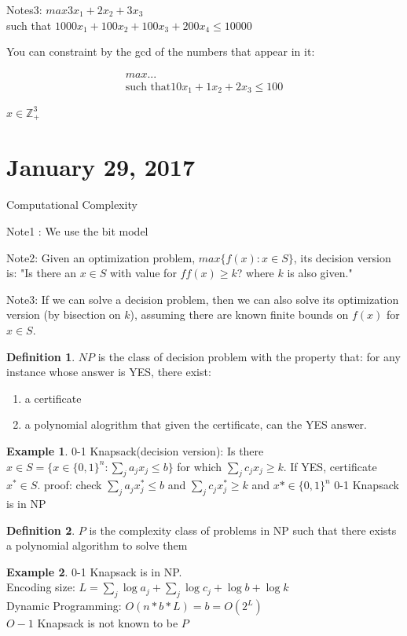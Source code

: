 \documentclass{article}
\theoremstyle{plain}
\theoremstyle{definition}
\newtheorem{eg}{Example}
\newtheorem{defn}{Definition}
\begin{document}
Notes3:
$max 3x_1 + 2x_2 + 3x_3$\\
such that $1000x_1 + 100x_2 + 100x_3 + 200x_4 \leq 10 000$

You can constraint by the gcd of the numbers that appear in it:

\begin{align*}
    max ...\\
    \text{such that} 10x_1 + 1x_2 + 2x_3 \leq 100
\end{align*}

$x\in\mathbb{Z}^3_+$

\section{January 29, 2017}
Computational Complexity

Note1 : We use the bit model

Note2: Given an optimization problem, $max\{f(x): x\in S\}$,
its decision version is:
"Is there an $x\in S$ with value for $ff(x) \geq k$? where
$k$ is also given."

Note3: If we can solve a decision problem, then we can also
solve its optimization version (by bisection on $k$), assuming
there are known finite bounds on $f(x)$ for $x\in S$.

\begin{defn}
    $NP$ is the class of decision problem with the property that:
    for any instance whose answer is YES, there exist:
    \begin{enumerate}
        \item a certificate
        \item a polynomial alogrithm that given the certificate, can
            the YES answer.
    \end{enumerate}
\end{defn}

\begin{eg}
    0-1 Knapsack(decision version): Is there
    $x\in S = \{x\in\{0,1\}^n: \sum_j a_jx_j\leq b\}$
    for which $\sum_j c_jx_j\geq k$. If YES,
    certificate $x^*\in S$. proof:
    check $\sum_j a_jx^*_j\leq b$ and
    $\sum_jc_jx^*_j \geq k$ and $x*\in \{0,1\}^n$
    0-1 Knapsack is in NP
\end{eg}

\begin{defn}
    $P$ is the complexity class of problems in NP such that
    there exists a polynomial algorithm to solve them
\end{defn}
\begin{eg}
    0-1 Knapsack is in NP.\\
    Encoding size: $L = \sum_j\log a_j + \sum_j\log c_j + \log b + \log k$\\
    Dynamic Programming: $O(n*b*L) = b = O(2^L)$\\
    $O-1$ Knapsack is not known to be $P$
\end{eg}
\end{document}
